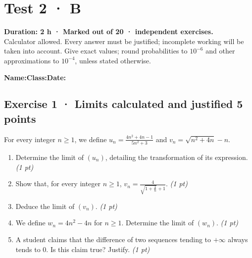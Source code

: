 \fi

\fi

\ifmxteacher

\mxnewpage{}\label{sujet:2-4}

\section*{Test 2 · B}


\textbf{Duration: 2 h · Marked out of 20 ·  independent exercises.}\\Calculator allowed. Every answer must be justified; incomplete working will be taken into account. Give exact values; round probabilities to $10^{-6}$ and other approximations to $10^{-4}$, unless stated otherwise.

\smallskip\textbf{Name:}\enspace\dotfill\quad\textbf{Class:}\enspace\dotfill\quad\textbf{Date:}\enspace\dotfill

\subsection*{Exercise 1 · Limits calculated and justified \hfill 5 points}For every integer $n\ge1$, we define $u_n=\frac{4n^2+4n-1}{5n^2+3}$ and $v_n=\sqrt{n^2+4n}-n$.

\begin{enumerate}

\item Determine the limit of $(u_n)$, detailing the transformation of its expression. \hfill\textit{(1 pt)}

\item Show that, for every integer $n\ge1$, $v_n=\frac{4}{\sqrt{1+\frac{4}n}+1}$. \hfill\textit{(1 pt)}

\item Deduce the limit of $(v_n)$. \hfill\textit{(1 pt)}

\item We define $w_n=4n^2-4n$ for $n\ge1$. Determine the limit of $(w_n)$. \hfill\textit{(1 pt)}

\item A student claims that the difference of two sequences tending to $+\infty$ always tends to $0$. Is this claim true? Justify. \hfill\textit{(1 pt)}

\end{enumerate}


